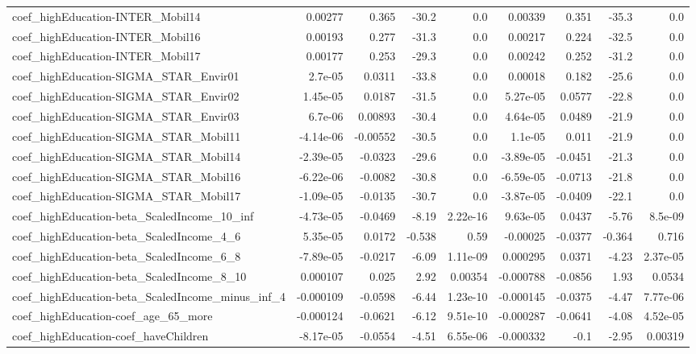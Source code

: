 \begin{tabular}{lrrrrrrrr}
coef_highEducation-INTER_Mobil14 & 0.00277 & 0.365 & -30.2 & 0.0 & 0.00339 & 0.351 & -35.3 & 0.0 \\
coef_highEducation-INTER_Mobil16 & 0.00193 & 0.277 & -31.3 & 0.0 & 0.00217 & 0.224 & -32.5 & 0.0 \\
coef_highEducation-INTER_Mobil17 & 0.00177 & 0.253 & -29.3 & 0.0 & 0.00242 & 0.252 & -31.2 & 0.0 \\
coef_highEducation-SIGMA_STAR_Envir01 & 2.7e-05 & 0.0311 & -33.8 & 0.0 & 0.00018 & 0.182 & -25.6 & 0.0 \\
coef_highEducation-SIGMA_STAR_Envir02 & 1.45e-05 & 0.0187 & -31.5 & 0.0 & 5.27e-05 & 0.0577 & -22.8 & 0.0 \\
coef_highEducation-SIGMA_STAR_Envir03 & 6.7e-06 & 0.00893 & -30.4 & 0.0 & 4.64e-05 & 0.0489 & -21.9 & 0.0 \\
coef_highEducation-SIGMA_STAR_Mobil11 & -4.14e-06 & -0.00552 & -30.5 & 0.0 & 1.1e-05 & 0.011 & -21.9 & 0.0 \\
coef_highEducation-SIGMA_STAR_Mobil14 & -2.39e-05 & -0.0323 & -29.6 & 0.0 & -3.89e-05 & -0.0451 & -21.3 & 0.0 \\
coef_highEducation-SIGMA_STAR_Mobil16 & -6.22e-06 & -0.0082 & -30.8 & 0.0 & -6.59e-05 & -0.0713 & -21.8 & 0.0 \\
coef_highEducation-SIGMA_STAR_Mobil17 & -1.09e-05 & -0.0135 & -30.7 & 0.0 & -3.87e-05 & -0.0409 & -22.1 & 0.0 \\
coef_highEducation-beta_ScaledIncome_10_inf & -4.73e-05 & -0.0469 & -8.19 & 2.22e-16 & 9.63e-05 & 0.0437 & -5.76 & 8.5e-09 \\
coef_highEducation-beta_ScaledIncome_4_6 & 5.35e-05 & 0.0172 & -0.538 & 0.59 & -0.00025 & -0.0377 & -0.364 & 0.716 \\
coef_highEducation-beta_ScaledIncome_6_8 & -7.89e-05 & -0.0217 & -6.09 & 1.11e-09 & 0.000295 & 0.0371 & -4.23 & 2.37e-05 \\
coef_highEducation-beta_ScaledIncome_8_10 & 0.000107 & 0.025 & 2.92 & 0.00354 & -0.000788 & -0.0856 & 1.93 & 0.0534 \\
coef_highEducation-beta_ScaledIncome_minus_inf_4 & -0.000109 & -0.0598 & -6.44 & 1.23e-10 & -0.000145 & -0.0375 & -4.47 & 7.77e-06 \\
coef_highEducation-coef_age_65_more & -0.000124 & -0.0621 & -6.12 & 9.51e-10 & -0.000287 & -0.0641 & -4.08 & 4.52e-05 \\
coef_highEducation-coef_haveChildren & -8.17e-05 & -0.0554 & -4.51 & 6.55e-06 & -0.000332 & -0.1 & -2.95 & 0.00319 \\

\end{tabular}

